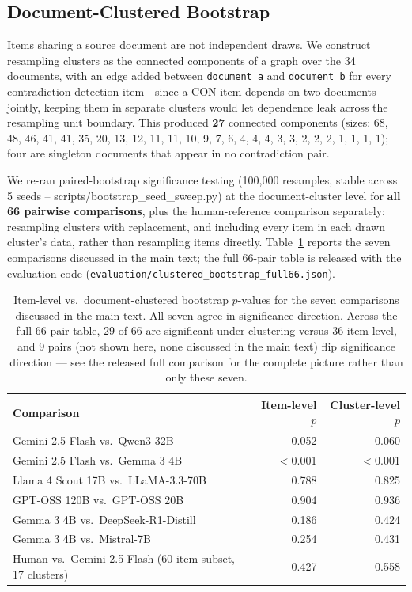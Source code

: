 \subsection{Document-Clustered Bootstrap}

Items sharing a source document are not independent draws. We construct resampling clusters as the
connected components of a graph over the 34 documents, with an edge added between
\texttt{document\_a} and \texttt{document\_b} for every contradiction-detection item---since a CON
item depends on two documents jointly, keeping them in separate clusters would let dependence leak
across the resampling unit boundary. This produced \textbf{27} connected components (sizes: 68, 48,
46, 41, 41, 35, 20, 13, 12, 11, 11, 10, 9, 7, 6, 4, 4, 4, 3, 3, 2, 2, 2, 1, 1, 1, 1); four are singleton
documents that appear in no contradiction pair.

We re-ran paired-bootstrap significance testing (100,000 resamples, stable across 5 seeds --
scripts/bootstrap\_seed\_sweep.py) at the document-cluster level for
\textbf{all 66 pairwise comparisons}, plus the human-reference comparison separately: resampling
clusters with replacement, and including every item in each drawn cluster's data, rather than
resampling items directly. Table~\ref{tab:clustered} reports the seven comparisons discussed in the
main text; the full 66-pair table is released with the evaluation code
(\texttt{evaluation/clustered\_bootstrap\_full66.json}).

\begin{table}[h]
\centering\small
\begin{tabular}{lrr}
\toprule
Comparison & Item-level $p$ & Cluster-level $p$ \\
\midrule
Gemini 2.5 Flash vs.\ Qwen3-32B & 0.052 & 0.060 \\
Gemini 2.5 Flash vs.\ Gemma 3 4B & $<$0.001 & $<$0.001 \\
Llama 4 Scout 17B vs.\ LLaMA-3.3-70B & 0.788 & 0.825 \\
GPT-OSS 120B vs.\ GPT-OSS 20B & 0.904 & 0.936 \\
Gemma 3 4B vs.\ DeepSeek-R1-Distill & 0.186 & 0.424 \\
Gemma 3 4B vs.\ Mistral-7B & 0.254 & 0.431 \\
Human vs.\ Gemini 2.5 Flash (60-item subset, 17 clusters) & 0.427 & 0.558 \\
\bottomrule
\end{tabular}
\caption{Item-level vs.\ document-clustered bootstrap $p$-values for the seven comparisons discussed
in the main text. All seven agree in significance direction. Across the full 66-pair table, 29 of 66
are significant under clustering versus 36 item-level, and 9 pairs (not shown here, none discussed
in the main text) flip significance direction --- see the released full comparison for the complete
picture rather than only these seven.}
\label{tab:clustered}
\end{table}

